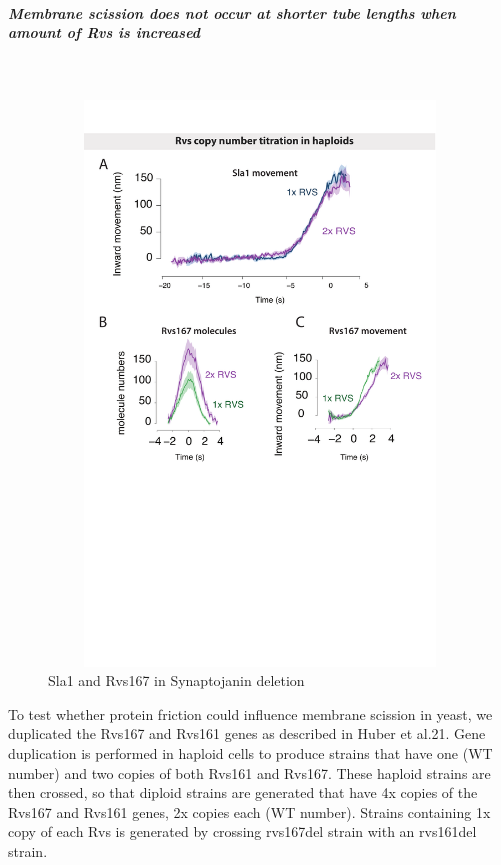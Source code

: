 	\subparagraph{Membrane scission does not occur at shorter tube lengths when amount of Rvs is increased}
		\mbox{}\\
		
				\begin{figure}
			\centering
			\includegraphics[width=15cm,height=15cm,keepaspectratio]{figures/results_final/rvs_haploid}
			\caption[Overexpression of the Rvs complex]
			{Sla1 and Rvs167 in Synaptojanin deletion
			 \label{fig5}}
			\end{figure}	
		

	To test whether protein friction could influence membrane scission in yeast, we duplicated the Rvs167 and Rvs161 genes as described in Huber et al.21. Gene duplication is performed in haploid cells to produce strains that have one (WT number) and two copies of both Rvs161 and Rvs167. These haploid strains are then crossed, so that diploid strains are generated that have 4x copies of the Rvs167 and Rvs161 genes, 2x copies each (WT number). Strains containing 1x copy of each Rvs is generated by crossing rvs167del strain with an rvs161del strain.
	


